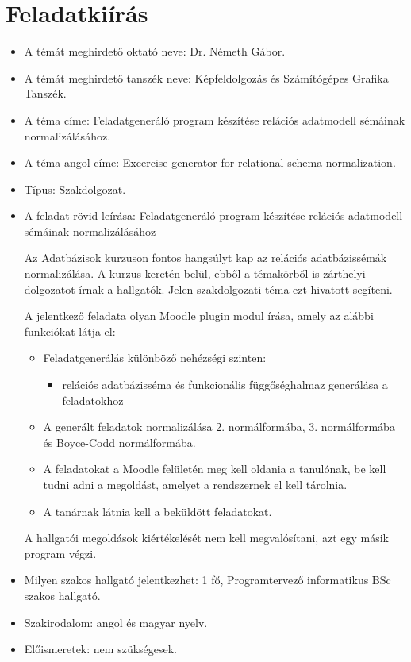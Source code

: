 \chapter*{Feladatkiírás}

\begin{itemize}
    \item A témát meghirdető oktató neve: Dr. Németh Gábor.
    \item A témát meghirdető tanszék neve: Képfeldolgozás és Számítógépes Grafika Tanszék.
    \item A téma címe: Feladatgeneráló program készítése relációs adatmodell sémáinak normalizálásához.
    \item A téma angol címe: Excercise generator for relational schema normalization.
    \item Típus: Szakdolgozat.
    \item A feladat rövid leírása: 
    Feladatgeneráló program készítése relációs adatmodell sémáinak normalizálásához

    Az Adatbázisok kurzuson fontos hangsúlyt kap az relációs adatbázissémák normalizálása. A kurzus keretén belül, ebből a témakörből is zárthelyi dolgozatot írnak a hallgatók. Jelen szakdolgozati téma ezt hivatott segíteni.
    
    A jelentkező feladata olyan Moodle plugin modul írása, amely az alábbi funkciókat látja el:
    \begin{itemize}
        \item Feladatgenerálás különböző nehézségi szinten:
        \begin{itemize}
            \item relációs adatbázisséma és funkcionális függőséghalmaz generálása a feladatokhoz
        \end{itemize}
        \item A generált feladatok normalizálása 2. normálformába, 3. normálformába és Boyce-Codd normálformába.
        \item A feladatokat a Moodle felületén meg kell oldania a tanulónak, be kell tudni adni a megoldást, amelyet a rendszernek el kell tárolnia.
        \item A tanárnak látnia kell a beküldött feladatokat.
    \end{itemize}
    A hallgatói megoldások kiértékelését nem kell megvalósítani, azt egy másik program végzi.
    \item Milyen szakos hallgató jelentkezhet: 1 fő, Programtervező informatikus BSc szakos hallgató.
    \item Szakirodalom: angol és magyar nyelv.
    \item Előismeretek: nem szükségesek.

\end{itemize}
